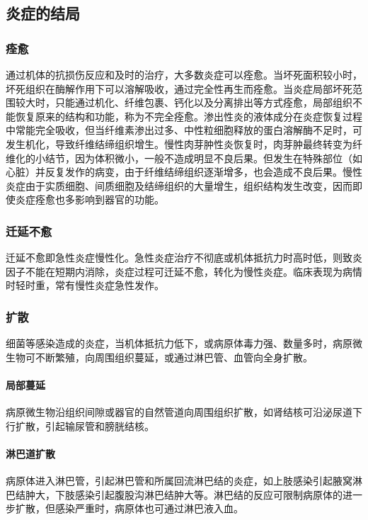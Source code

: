 \subsection{炎症的结局}

\subsubsection{痊愈}

通过机体的抗损伤反应和及时的治疗，大多数炎症可以痊愈。当坏死面积较小时，坏死组织在酶解作用下可以溶解吸收，通过完全性再生而痊愈。当炎症局部坏死范围较大时，只能通过机化、纤维包裹、钙化以及分离排出等方式痊愈，局部组织不能恢复原来的结构和功能，称为不完全痊愈。渗出性炎的液体成分在炎症恢复过程中常能完全吸收，但当纤维素渗出过多、中性粒细胞释放的蛋白溶解酶不足时，可发生机化，导致纤维结缔组织增生。慢性肉芽肿性炎恢复时，肉芽肿最终转变为纤维化的小结节，因为体积微小，一般不造成明显不良后果。但发生在特殊部位（如心脏）并反复发作的病变，由于纤维结缔组织逐渐增多，也会造成不良后果。慢性炎症由于实质细胞、间质细胞及结缔组织的大量增生，组织结构发生改变，因而即使炎症痊愈也多影响到器官的功能。

\subsubsection{迁延不愈}

迁延不愈即急性炎症慢性化。急性炎症治疗不彻底或机体抵抗力时高时低，则致炎因子不能在短期内消除，炎症过程可迁延不愈，转化为慢性炎症。临床表现为病情时轻时重，常有慢性炎症急性发作。

\subsubsection{扩散}

细菌等感染造成的炎症，当机体抵抗力低下，或病原体毒力强、数量多时，病原微生物可不断繁殖，向周围组织蔓延，或通过淋巴管、血管向全身扩散。

\paragraph{局部蔓延}
病原微生物沿组织间隙或器官的自然管道向周围组织扩散，如肾结核可沿泌尿道下行扩散，引起输尿管和膀胱结核。

\paragraph{淋巴道扩散}
病原体进入淋巴管，引起淋巴管和所属回流淋巴结的炎症，如上肢感染引起腋窝淋巴结肿大，下肢感染引起腹股沟淋巴结肿大等。淋巴结的反应可限制病原体的进一步扩散，但感染严重时，病原体也可通过淋巴液入血。


